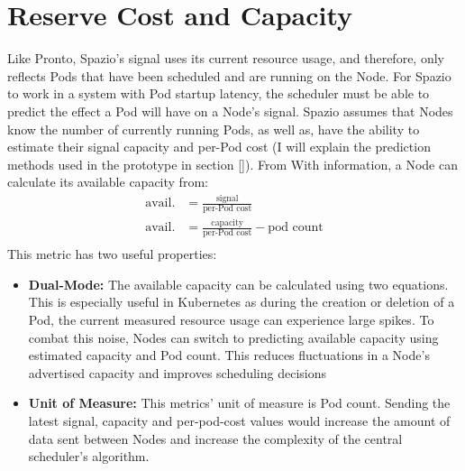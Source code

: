 \section{Reserve Cost and Capacity}
\label{sec:spazio-cost-capacity}
Like Pronto, Spazio's signal uses its current resource usage, and therefore, only
reflects Pods that have been scheduled and are running on the Node. For Spazio
to work in a system with Pod startup latency, the scheduler must be able to
predict the effect a Pod will have on a Node's signal. Spazio assumes that Nodes
know the number of currently running Pods, as well as, have the ability to
estimate their signal capacity and per-Pod cost (I will explain the prediction
methods used in the prototype in section \ref{}). From With information, a Node
can calculate its available capacity from:
\begin{align}
    \text{avail.} &= \frac{\text{signal}}{\text{per-Pod cost}} \\
    \text{avail.} &= \frac{\text{capacity}}{\text{per-Pod cost}} - \text{pod
    count}\\
\end{align}
This metric has two useful properties:
\begin{itemize}
    \item \textbf{Dual-Mode:} The available capacity can be calculated
        using two equations. This is especially useful in Kubernetes as during
        the creation or deletion of a Pod, the current measured resource usage
        can experience large spikes. To combat this noise, Nodes can switch to
        predicting available capacity using estimated capacity and Pod count.
        This reduces fluctuations in a Node's advertised capacity and improves
        scheduling decisions
    \item \textbf{Unit of Measure:} This metrics' unit of measure is Pod count.
        Sending the latest signal, capacity and per-pod-cost values would
        increase the amount of data sent between Nodes and increase the
        complexity of the central scheduler's algorithm.
\end{itemize}

